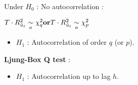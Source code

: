 \begin{f}[Detection]
\begin{itemize}[leftmargin=*]
Under $H_{0}$ : No autocorrelation :

\begin{center}
$\hfill T \cdot R^{2}_{\hat{u}_t}\underset{a}{\sim}\chi^{2}_{q} \hfill \textbf{or} \hfill T \cdot R^{2}_{\hat{u}_t}\underset{a}{\sim}\chi^{2}_{p} \hfill$
\end{center}

\begin{itemize}[leftmargin=*]
\item $H_{1}$ : Autocorrelation of order $q$ (or $p$).
\end{itemize}

\textbf{Ljung-Box Q test} :

\begin{itemize}[leftmargin=*]
\item $H_{1}$ : Autocorrelation up to lag $h$.
\end{itemize}

\end{itemize}



\end{f}  

